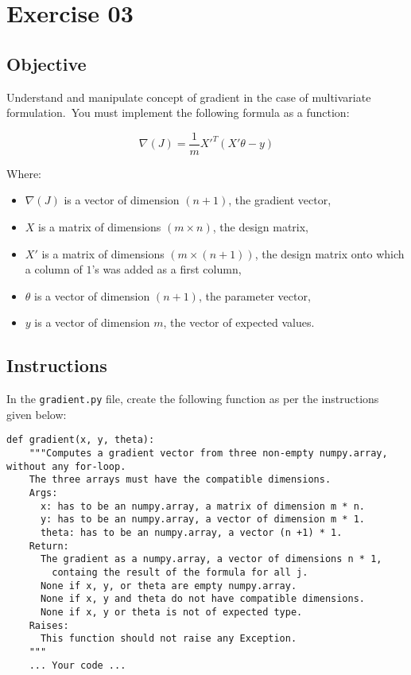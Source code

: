 \chapter{Exercise 03}

\newpage
{}
\makeheaderfilesforbidden

\section*{Objective}
Understand and manipulate concept of gradient in the case of multivariate formulation.\
You must implement the following formula as a function:    

$$
\nabla(J) = \frac{1}{m} {X'}^T(X'\theta - y)
$$  

Where:  
\begin{itemize}
  \item $\nabla(J)$ is a vector of dimension $(n + 1)$, the gradient vector,
  \item $X$ is a matrix of dimensions $(m \times n)$, the design matrix,
  \item $X'$ is a matrix of dimensions $(m \times (n + 1))$, the design matrix onto which a column of $1$'s was added as a first column,
  \item $\theta$ is a vector of dimension $(n + 1)$, the parameter vector,
  \item $y$ is a vector of dimension $m$, the vector of expected values.
\end{itemize}


\section*{Instructions}
In the \texttt{gradient.py} file, create the following function as per the instructions given below:
\par
\begin{verbatim}
def gradient(x, y, theta):
    """Computes a gradient vector from three non-empty numpy.array, without any for-loop.
    The three arrays must have the compatible dimensions.
    Args:
      x: has to be an numpy.array, a matrix of dimension m * n.
      y: has to be an numpy.array, a vector of dimension m * 1.
      theta: has to be an numpy.array, a vector (n +1) * 1.
    Return:
      The gradient as a numpy.array, a vector of dimensions n * 1,
        containg the result of the formula for all j.
      None if x, y, or theta are empty numpy.array.
      None if x, y and theta do not have compatible dimensions.
      None if x, y or theta is not of expected type.
    Raises:
      This function should not raise any Exception.
    """
    ... Your code ...
\end{verbatim}

